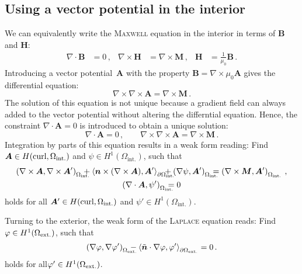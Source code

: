 \subsection*{Using a vector potential in the interior}
We can equivalently write the \textsc{Maxwell} equation in the interior in terms of $\bm{B}$ and $\bm{H}$:
\begin{equation}
\begin{aligned}
	\nabla\cdot\bm{B}&=0\,, & 
	\nabla\times\bm{H}&=\nabla\times\bm{M}\,, &
	\bm{H}&=\frac{1}{\mu_0}\bm{B}\,.
\end{aligned}
\end{equation}
Introducing a vector potential~$\bm{A}$ with the property $\bm{B}=\nabla\times\mu_0\bm{A}$ gives the differential equation:
\begin{equation}
	\nabla\times\nabla\times\bm{A}=\nabla\times\bm{M}\,.
\end{equation}
The solution of this equation is not unique because a gradient field can always added to the vector potential without altering the differntial equation. Hence, the constraint $\nabla\cdot\bm{A}=0$ is introduced to obtain a unique solution:
\begin{equation}
	\nabla\cdot\bm{A}=0\,,\qquad
	\nabla\times\nabla\times\bm{A}=\nabla\times\bm{M}\,.
\end{equation}
Integration by parts of this equation results in a weak form reading: Find $\bm{A}\in H(\operatorname{curl}, \Omega_\mathrm{int.})$ and $\psi\in H^1(\Omega_\mathrm{int.})$, such that
\begin{equation}
\begin{gathered}
	\label{eqn:WeakFormA}
	\left(\nabla\times\bm{A},\nabla\times\bm{A}'\right)_{\mathrlap{\Omega_\mathrm{int.}}\ \ }+\left\langle\bm{n}\times(\nabla\times\bm{A}),\bm{A}'\right\rangle_{\mathrlap{\p\Omega_\mathrm{int.}}\ \ }+\left(\nabla\psi,\bm{A}'\right)	_{\mathrlap{\Omega_\mathrm{int.}}\ \ }=\left(\nabla\times\bm{M},\bm{A}'\right)_{\Omega_\mathrm{int.}}\,,\\
	\left(\nabla\cdot\bm{A},\psi'\right)_{\mathrlap{\Omega_\mathrm{int.}}\ \ }=0
\end{gathered}
\end{equation}
holds for all $\bm{A}'\in H(\operatorname{curl}, \Omega_\mathrm{int.})$ and $\psi'\in H^1(\Omega_\mathrm{int.})$.

Turning to the exterior, the weak form of the \textsc{Laplace} equation reads: Find $\varphi\in H^1(\Omega_\mathrm{ext.})$, such that
\begin{equation}
	\left(\nabla\vp,\nabla\vp'\right)_{\mathrlap{\Omega_\mathrm{ext.}}\ \ }
	-\left\langle\tilde{\bm{n}}\cdot\nabla\vp,\vp'\right\rangle_{\p\Omega_\mathrm{ext.}}=0\,.
\end{equation}
holds for all$\varphi'\in H^1(\Omega_\mathrm{ext.})$.

